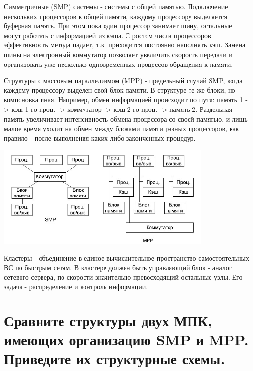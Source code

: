 \documentclass[unicode, 12pt, a4paper, oneside]{article}
\begin{document}
Симметричные (SMP) системы - системы с общей памятью. Подключение нескольких процессоров к общей памяти, каждому процессору выделяется буферная память. При этом пока один процессор занимает шину, остальные могут работать с информацией из кэша. С ростом числа процессоров эффективность метода падает, т.к. приходится постоянно наполнять кэш. Замена шины на электронный коммутатор позволяет увеличить скорость передачи и организовать уже несколько одновременных процессов обращения к памяти. 

Структуры с массовым параллелизмом (MPP) - предельный случай SMP, когда каждому процессору выделен свой блок памяти. В структуре те же блоки, но компоновка иная. Например, обмен информацией происходит по пути: память 1 -> кэш 1-го проц. -> коммутатор -> кэш 2-го проц. -> память 2. Раздельная память увеличивает интенсивность обмена процессора со своей памятью, и лишь малое время уходит на обмен между блоками памяти разных процессоров, как правило - после выполнения каких-либо законченных процедур.

\begin{center}
\includegraphics[width=0.8\textwidth]{117_SMP_MPP.png}\\
\end{center}
Кластеры - объединение в единое вычислительное пространство самостоятельных ВС по быстрым сетям. В кластере должен быть управляющий блок - аналог сетевого сервера, по скорости значительно превосходящий остальные узлы. Его задача - распределение и контроль информации.

\section{Сравните структуры двух МПК, имеющих организацию SMP и MPP. Приведите их структурные схемы.}
\end{document}
